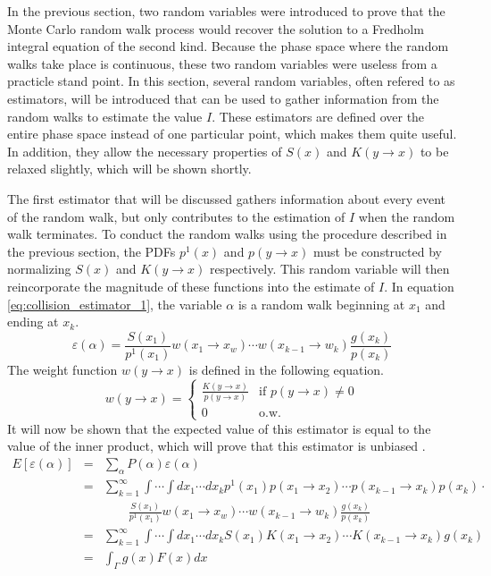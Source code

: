 In the previous section, two random variables were introduced to prove that
the Monte Carlo random walk process would recover the solution to a Fredholm
integral equation of the second kind. Because the phase space where the random
walks take place is continuous, these two random variables were useless from
a practicle stand point. In this section, several random variables, often 
refered to as estimators, will be introduced that can be used to gather 
information from the random walks to estimate the value $I$. These estimators
are defined over the entire phase space instead of one particular point, 
which makes them quite useful. In addition, they allow the necessary properties
of $S(x)$ and $K(y \to x)$ to be relaxed slightly, which will be shown shortly.


The first estimator that will be discussed gathers information about every
event of the random walk, but only contributes to the estimation of $I$ when
the random walk terminates. To conduct the random walks using the procedure
described in the previous section, the PDFs $p^1(x)$ and $p(y \to x)$ must be 
constructed by normalizing $S(x)$ and $K(y \to x)$ respectively. This random
variable will then reincorporate the magnitude of these functions into
the estimate of $I$. In equation \ref{eq:collision_estimator_1}, the variable 
$\alpha$ is a random walk beginning at $x_1$ and ending at $x_k$.
\begin{equation}
  \varepsilon(\alpha) = \frac{S(x_1)}{p^1(x_1)}w(x_1 \to x_w)\cdots 
  w(x_{k-1} \to w_k)\frac{g(x_k)}{p(x_k)}
  \label{eq:collision_estimator_1}
\end{equation}
The weight function $w(y \to x)$ is defined in the following equation.
\begin{equation}
  w(y \to x) = 
  \begin{cases}
    \frac{K(y \to x)}{p(y \to x)} & \text{if } p(y \to x) \neq 0 \\
    0 & \text{o.w.}
  \end{cases}
\end{equation}
It will now be shown that the expected value of this estimator is equal to the 
value of the inner product, which will prove that this estimator is unbiased 
\citep{spanier_monte_1969}.
\begin{eqnarray}
  E\left[\varepsilon(\alpha)\right] & = & \sum_{\alpha} 
  P(\alpha)\varepsilon(\alpha) \nonumber \\
  & = & \sum_{k=1}^{\infty} \int \cdots \int dx_1 \cdots dx_k p^1(x_1)
  p(x_1 \to x_2) \cdots p(x_{k-1} \to x_k)p(x_k) \cdot \nonumber \\
  & & \qquad \frac{S(x_1)}{p^1(x_1)}w(x_1 \to x_w)\cdots 
  w(x_{k-1} \to w_k)\frac{g(x_k)}{p(x_k)} \nonumber \\
  & = & \sum_{k=1}^{\infty} \int \cdots \int dx_1 \cdots dx_k S(x_1)K(x_1 \to x_2)
  \cdots K(x_{k-1} \to x_k)g(x_k) \nonumber \\
  & = & \int_{\Gamma} g(x)F(x)dx \nonumber  
\end{eqnarray}

